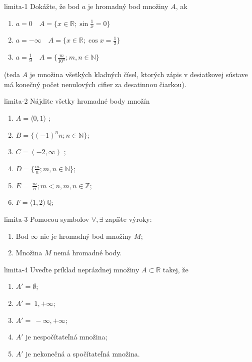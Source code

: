 \begin{defproblem}{limita-1}
Dokážte, že bod $a$ je hromadný bod množiny $A$, ak
\begin{enumerate}
    \item $a=0 \quad A=\{x \in \mathbb{R}; \sin{\frac{1}{x}} = 0 \}$
    \item $a=-\infty \quad A=\{x \in \mathbb{R}; \cos{x} = \frac{1}{2} \}$
    \item $a=\frac{1}{9} \quad A=\{\frac{m}{10^n}; m,n \in \mathbb{N} \}$
\end{enumerate}
(teda $A$ je množina všetkých kladných čísel, ktorých zápis v desiatkovej
sústave má konečný počet nenulových cifier za desatinnou čiarkou).
\end{defproblem}

\begin{defproblem}{limita-2}
Nájdite všetky hromadné body množín
\begin{multicols}{2}
\begin{enumerate}
\item $A= \langle 0,1 \rangle$ ;
\item $B= \{ (-1)^n n; n\in \mathbb{N} \} $;
\item $C= (-2,\infty)$ ;
\item $D= \{\frac{m}{n}; m,n \in \mathbb{N} \}$;
\item $E= {\ \frac{m}{n}; m<n,m,n \in \mathbb{Z}}$;
\item $F= \langle 1,2 ) \ \mathbb{Q}$;
\end{enumerate}
\end{multicols}
\end{defproblem}

\begin{defproblem}{limita-3}
Pomocou symbolov $\forall,\exists$ zapíšte výroky:
\begin{enumerate}
\item Bod $\infty$ nie je hromadný bod množiny $M$;
\item Množina $M$ nemá hromadné body.
\end{enumerate}
\end{defproblem}

\begin{defproblem}{limita-4}
Uveďte príklad neprázdnej množiny $A \subset \mathbb{R}$ takej, že
\begin{enumerate}
\item $A'=\emptyset$;
\item $A'={\ 1, +\infty}$;
\item $A'={\ -\infty,+\infty}$;
\item $A'$ je nespočítateľná množina;
\item $A'$ je nekonečná a spočítateľná množina.
\end{enumerate}
\end{defproblem}

